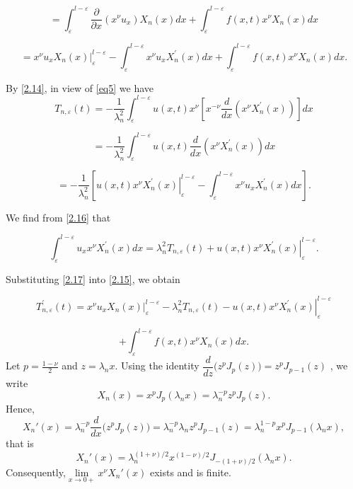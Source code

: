 \documentclass[reqno]{amsart}
\theoremstyle{definition}
\numberwithin{equation}{section}
\begin{document}
$$= \int_{\varepsilon}^{l-\varepsilon} \frac{\partial}{\partial x}\left(x^\nu u_x\right) X_n(x) d x +\int_{\varepsilon}^{l-\varepsilon}f(x,t)x^\nu X_n(x)dx$$




\begin{equation}\label{2.15}
  =\left.x^\nu u_x X_n(x)\right|_{\varepsilon} ^{l-\varepsilon}-\int_{\varepsilon}^{l-\varepsilon} x^\nu u_x X_n^{\prime}(x) d x +\int_{\varepsilon}^{l-\varepsilon}f(x,t)x^\nu X_n(x)dx.
\end{equation}


By \eqref{2.14}, in view of \eqref{eq5} we have
$$T_{n, \varepsilon}(t)  =-\frac{1}{\lambda_n^2} \int_{\varepsilon}^{l-\varepsilon} u(x, t) x^\nu\left[x^{-\nu}\frac{d}{d x} \left(x^\nu X_n^{\prime}(x)\right)\right] d x$$

$$=-\frac{1}{\lambda_n^2} \int_{\varepsilon}^{l-\varepsilon} u(x, t) \frac{d}{d x}\left(x^\nu X_n^{\prime}(x)\right) d x$$

\begin{equation}\label{2.16}
    = -\frac{1}{\lambda_n^2}\left[\left.u(x, t) x^\nu X_n^{\prime}(x)\right|_{\varepsilon} ^{l-\varepsilon}-\int_{\varepsilon}^{l-\varepsilon} x^\nu u_x X_n^{\prime}(x) d x\right].
\end{equation}


We find from \eqref{2.16} that

\begin{equation}\label{2.17}
    \int_{\varepsilon}^{l-\varepsilon} u_x x^\nu X_n^{\prime}(x) d x=\lambda_n^2 T_{n, \varepsilon}(t)+\left.u(x, t) x^\nu X_n^{\prime}(x)\right|_{\varepsilon} ^{l-\varepsilon}.
\end{equation}



Substituting \eqref{2.17} into \eqref{2.15}, we obtain

$$T_{n, \varepsilon}^{\prime }(t)=\left.x^\nu u_x X_n(x)\right|_{\varepsilon} ^{l-\varepsilon}-\lambda_n^2 T_{n, \varepsilon}(t)-\left.u(x, t) x^\nu X_n^{\prime}(x)\right|_{\varepsilon} ^{l-\varepsilon} $$

\begin{equation}\label{2.18}
    +\int_{\varepsilon}^{l-\varepsilon}f(x,t)x^\nu X_n(x)dx.
\end{equation}
Let $p=\frac{1-\nu}{2}$ and $z=\lambda_n x$. Using the identity
$\dfrac{d}{dz}\big(z^p J_p(z)\big)=z^p J_{p-1}(z)$ \cite{Watson}, we write
$$
X_n(x)=x^p J_p(\lambda_n x)=\lambda_n^{-p} z^p J_p(z).
$$
Hence,
$$
X_n'(x)=\lambda_n^{-p}\frac{d}{dx}\big(z^p J_p(z)\big)
=\lambda_n^{-p}\lambda_n z^p J_{p-1}(z)
=\lambda_n^{1-p}x^p J_{p-1}(\lambda_n x),
$$
that is
$$
X_n'(x)=\lambda_n^{(1+\nu)/2}x^{(1-\nu)/2}J_{-(1+\nu)/2}(\lambda_n x).
$$
Consequently,$\underset{x\to0+}{\lim}x^\nu X_n'(x) $ exists and is finite.
\end{document}
